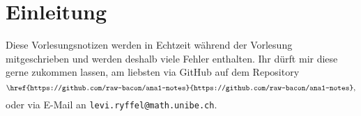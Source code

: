 \documentclass[../main.tex]{subfiles}
\begin{document}
\chapter*{Einleitung}
Diese Vorlesungsnotizen werden in Echtzeit während der Vorlesung mitgeschrieben
und werden deshalb viele Fehler enthalten.
Ihr dürft mir diese gerne zukommen lassen, am liebsten via GitHub
auf dem Repository
\[
\texttt{\href{https://github.com/raw-bacon/ana1-notes}{https://github.com/raw-bacon/ana1-notes}},
\]
oder via E-Mail an \texttt{levi.ryffel@math.unibe.ch}.
\end{document}
